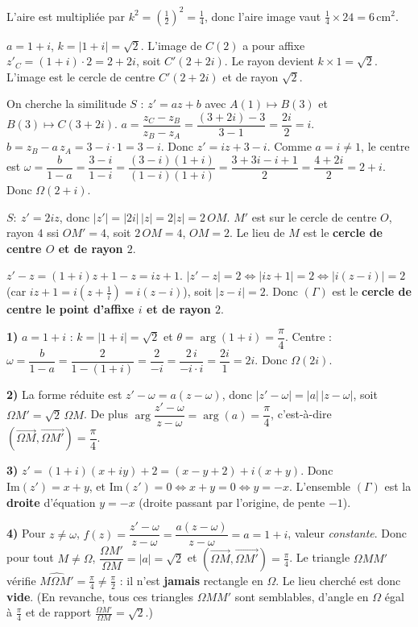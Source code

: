 L'aire est multipliée par $k^2=\left(\frac12\right)^2=\frac14$, donc l'aire image vaut $\frac14\times24=6\,\text{cm}^2$.

$a=1+i$, $k=|1+i|=\sqrt2$. L'image de $C(2)$ a pour affixe $z'_C=(1+i)\cdot2=2+2i$, soit $C'(2+2i)$.
Le rayon devient $k\times1=\sqrt2$. L'image est le cercle de centre $C'(2+2i)$ et de rayon $\sqrt2$.

On cherche la similitude $S$ : $z'=az+b$ avec $A(1)\mapsto B(3)$ et $B(3)\mapsto C(3+2i)$.
$a=\dfrac{z_C-z_B}{z_B-z_A}=\dfrac{(3+2i)-3}{3-1}=\dfrac{2i}{2}=i$. $b=z_B-a\,z_A=3-i\cdot1=3-i$.
Donc $z'=iz+3-i$. Comme $a=i\neq1$, le centre est $\omega=\dfrac{b}{1-a}=\dfrac{3-i}{1-i}=\dfrac{(3-i)(1+i)}{(1-i)(1+i)}
=\dfrac{3+3i-i+1}{2}=\dfrac{4+2i}{2}=2+i$. Donc $\Omega(2+i)$.

$S:\ z'=2iz$, donc $|z'|=|2i|\,|z|=2|z|=2\,OM$. $M'$ est sur le cercle de centre $O$, rayon $4$ ssi
$OM'=4$, soit $2\,OM=4$, $OM=2$. Le lieu de $M$ est le \textbf{cercle de centre $O$ et de rayon $2$}.

$z'-z=(1+i)z+1-z=iz+1$. $|z'-z|=2\iff|iz+1|=2\iff|i(z-i)|=2$ (car $iz+1=i(z+\frac1i)=i(z-i)$),
soit $|z-i|=2$. Donc $(\Gamma)$ est le \textbf{cercle de centre le point d'affixe $i$ et de rayon $2$}.

\textbf{1)} $a=1+i$ : $k=|1+i|=\sqrt2$ et $\theta=\arg(1+i)=\dfrac\pi4$. Centre :
$\omega=\dfrac{b}{1-a}=\dfrac{2}{1-(1+i)}=\dfrac{2}{-i}=\dfrac{2\,i}{-i\cdot i}=\dfrac{2i}{1}=2i$. Donc $\Omega(2i)$.

\smallskip\textbf{2)} La forme réduite est $z'-\omega=a(z-\omega)$, donc $|z'-\omega|=|a|\,|z-\omega|$, soit
$\Omega M'=\sqrt2\,\Omega M$. De plus $\arg\dfrac{z'-\omega}{z-\omega}=\arg(a)=\dfrac\pi4$, c'est-à-dire
$(\overrightarrow{\Omega M},\overrightarrow{\Omega M'})=\dfrac\pi4$.

\smallskip\textbf{3)} $z'=(1+i)(x+iy)+2=(x-y+2)+i(x+y)$. Donc $\mathrm{Im}(z')=x+y$, et
$\mathrm{Im}(z')=0\iff x+y=0\iff y=-x$. L'ensemble $(\Gamma)$ est la \textbf{droite} d'équation $y=-x$
(droite passant par l'origine, de pente $-1$).

\smallskip\textbf{4)} Pour $z\neq\omega$, $f(z)=\dfrac{z'-\omega}{z-\omega}=\dfrac{a(z-\omega)}{z-\omega}=a=1+i$, valeur
\emph{constante}. Donc pour tout $M\neq\Omega$, $\dfrac{\Omega M'}{\Omega M}=|a|=\sqrt2$ et
$(\overrightarrow{\Omega M},\overrightarrow{\Omega M'})=\frac\pi4$. Le triangle $\Omega M M'$ vérifie
$\widehat{M\Omega M'}=\frac\pi4\neq\frac\pi2$ : il n'est \textbf{jamais} rectangle en $\Omega$. Le lieu cherché est donc
\textbf{vide}. (En revanche, tous ces triangles $\Omega M M'$ sont semblables, d'angle en $\Omega$ égal à
$\frac\pi4$ et de rapport $\frac{\Omega M'}{\Omega M}=\sqrt2$.)


